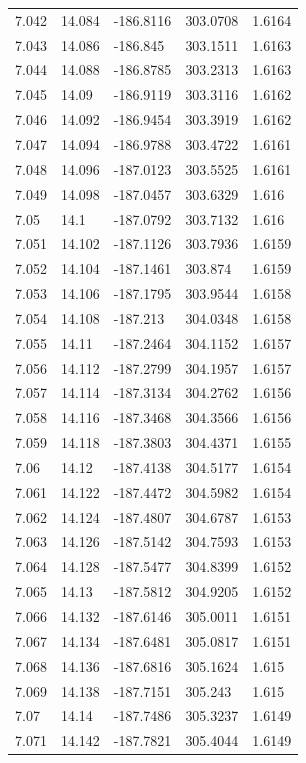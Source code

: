 \begin{tabular}{lllll}
7.042 & 14.084 & -186.8116 & 303.0708 & 1.6164 \\
7.043 & 14.086 & -186.845 & 303.1511 & 1.6163 \\
7.044 & 14.088 & -186.8785 & 303.2313 & 1.6163 \\
7.045 & 14.09 & -186.9119 & 303.3116 & 1.6162 \\
7.046 & 14.092 & -186.9454 & 303.3919 & 1.6162 \\
7.047 & 14.094 & -186.9788 & 303.4722 & 1.6161 \\
7.048 & 14.096 & -187.0123 & 303.5525 & 1.6161 \\
7.049 & 14.098 & -187.0457 & 303.6329 & 1.616 \\
7.05 & 14.1 & -187.0792 & 303.7132 & 1.616 \\
7.051 & 14.102 & -187.1126 & 303.7936 & 1.6159 \\
7.052 & 14.104 & -187.1461 & 303.874 & 1.6159 \\
7.053 & 14.106 & -187.1795 & 303.9544 & 1.6158 \\
7.054 & 14.108 & -187.213 & 304.0348 & 1.6158 \\
7.055 & 14.11 & -187.2464 & 304.1152 & 1.6157 \\
7.056 & 14.112 & -187.2799 & 304.1957 & 1.6157 \\
7.057 & 14.114 & -187.3134 & 304.2762 & 1.6156 \\
7.058 & 14.116 & -187.3468 & 304.3566 & 1.6156 \\
7.059 & 14.118 & -187.3803 & 304.4371 & 1.6155 \\
7.06 & 14.12 & -187.4138 & 304.5177 & 1.6154 \\
7.061 & 14.122 & -187.4472 & 304.5982 & 1.6154 \\
7.062 & 14.124 & -187.4807 & 304.6787 & 1.6153 \\
7.063 & 14.126 & -187.5142 & 304.7593 & 1.6153 \\
7.064 & 14.128 & -187.5477 & 304.8399 & 1.6152 \\
7.065 & 14.13 & -187.5812 & 304.9205 & 1.6152 \\
7.066 & 14.132 & -187.6146 & 305.0011 & 1.6151 \\
7.067 & 14.134 & -187.6481 & 305.0817 & 1.6151 \\
7.068 & 14.136 & -187.6816 & 305.1624 & 1.615 \\
7.069 & 14.138 & -187.7151 & 305.243 & 1.615 \\
7.07 & 14.14 & -187.7486 & 305.3237 & 1.6149 \\
7.071 & 14.142 & -187.7821 & 305.4044 & 1.6149 \\

\end{tabular}
